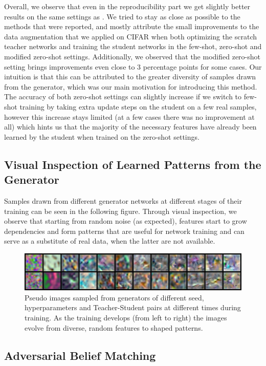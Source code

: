 Overall, we observe that even in the reproducibility part we get slightly better results on the same settings as \cite{Micaelli2019ZeroShotKT}. We tried to stay as close as possible to the methods that were reported, and mostly attribute the small improvements to the data augmentation that we applied on CIFAR when both optimizing the scratch teacher networks and training the student networks in the few-shot, zero-shot and modified zero-shot settings. Additionally, we observed that the modified zero-shot setting brings improvements even close to 3 percentage points for some cases. Our intuition is that this can be attributed to the greater diversity of samples drawn from the generator, which was our main motivation for introducing this method. The accuracy of both zero-shot settings can slightly increase if we switch to few-shot training by taking extra update steps on the student on a few real samples, however this increase stays limited (at a few cases there was no improvement at all) which hints us that the majority of the necessary features have already been learned by the student when trained on the zero-shot settings.  

\subsection{Visual Inspection of Learned Patterns from the Generator}
Samples drawn from different generator networks at different stages of their training can be seen in the following figure. Through visual inspection, we observe that starting from random noise (as expected), features start to grow dependencies and form patterns that are useful for network training and can serve as a substitute of real data, when the latter are not available.
\begin{figure}[h]
  \centering
  \includegraphics[width=120mm]{images/pseudo_data.png}
  \caption{Pseudo images sampled from generators of different seed, hyperparameters and Teacher-Student pairs at different times during training. As the training develops (from left to right) the images evolve from diverse, random features to shaped patterns. }
  \label{fig:pseudo_images}
\end{figure}

\subsection{Adversarial Belief Matching}

